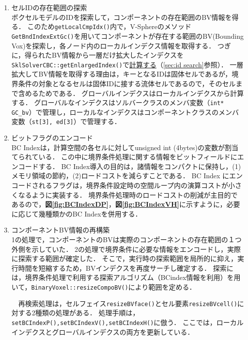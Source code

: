 \begin{enumerate}
\item セルIDの存在範囲の探索\\
ボクセルモデルのIDを探索して，コンポーネントの存在範囲のBV情報を得る．
このため\verb|getLocalCmpIdx()|内で，V-Sphereのメソッド\verb|GetBndIndexExtGc()|を用いてコンポーネントが存在する範囲のBV(Bounding Vox)を探索し，各ノード内のローカルインデクス情報を取得する．
つぎに，得られたBV情報から一層だけ拡大したインデクスを\verb|SklSolverCBC::getEnlargedIndex()|で\hyperlink{tgt:id search}{計算する}（\ref{sec:id search}参照）．
一層拡大してBV情報を取得する理由は，キーとなるIDは固体セルであるが，境界条件の対象となるセルは固体IDに接する流体セルであるので，そのセルまで含めるためである．
グローバルインデクスはローカルインデクスから計算する．
グローバルなインデクスはソルバークラスのメンバ変数（\verb|int* GC_bv|）で管理し，ローカルなインデクスはコンポーネントクラスのメンバ変数（\verb|st[3], ed[3]|）で管理する．

\vspace{2mm}

\item ビットフラグのエンコード\\
BC Indexは，計算空間の各セルに対してunsigned int (4bytes)の変数が割当てられている．
この中に境界条件処理に関する情報をビットフィールドにエンコードする．
BC Index導入の目的は，諸情報をコンパクトに保持し，(1)メモリ領域の節約，(2)ロードコストを減らすことである．
BC Index にエンコードされるフラグは，境界条件設定時の空間ループ内の演算コストが小さくなるように実装する．
境界条件処理時のロードコストの削減が主目的であるので，\textbf{図\ref{fig:BCIndexDP}}，\textbf{図\ref{fig:BCIndexVH}}に示すように，必要に応じて幾種類かのBC Indexを併用する．
\vspace{2mm}

\item コンポーネントBV情報の再構築\\
1の処理で，コンポーネントのBVは実際のコンポーネントの存在範囲の１つ外側を示していた．
2の処理で境界条件に必要な情報をエンコードし，実際に探索する範囲が確定した．
そこで，実行時の探索範囲を局所的に抑え，実行時間を短縮するため，BVインデクスを再度サーチし確定する．
探索には，境界条件処理で利用する探索アルゴリズム（BCindex情報を利用）を用いて，\verb|BinaryVoxel::resizeCompoBV()|により範囲を定める．

　再検索処理は，セルフェイス\verb|resizeBVface()|とセル要素\verb|resizeBVcell()|に対する2種類の処理がある．
処理手順は，\verb|setBCIndexP(),setBCIndexV(),setBCIndexH()|に倣う．
ここでは，ローカルインデクスとグローバルインデクスの両方を更新している．

\end{enumerate}

